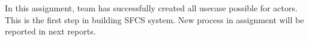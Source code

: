 In this assignment, team has successfully created all usecase possible for actors. This is the first step in building SFCS system. New process in assignment will be reported in next reports.
